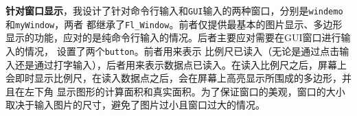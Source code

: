 \textbf{针对窗口显示}，我设计了针对命令行输入和\texttt{GUI}输入的两种窗口，分别是\texttt{windemo}和\texttt{myWindow}，两者
都继承了\texttt{Fl_Window}。前者仅提供最基本的图片显示、多边形显示的功能，应对的是纯命令行输入的情况。后者主要应对需要在GUI窗口进行输入的情况，
设置了两个\texttt{button}。前者用来表示
比例尺已读入（无论是通过点击输入还是通过打字输入），后者用来表示数据点已读入。在读入比例尺之后，屏幕上会即时显示比例尺，在读入数据点之后，会在屏幕上高亮显示所围成的多边形，并且在左下角
显示图形的计算面积和真实面积。为了保证窗口的美观，窗口的大小取决于输入图片的尺寸，避免了图片过小且窗口过大的情况。